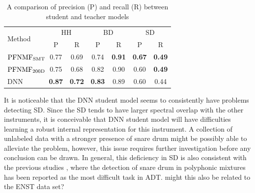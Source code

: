 \documentclass{article}
\begin{document}
\begin{table}
\centering
\begin{tabular}{l|cccccc}
\hline
\multirow{2}{*}{Method} & \multicolumn{2}{c}{HH}          & \multicolumn{2}{c}{BD}          & \multicolumn{2}{c}{SD}          \\ \cline{2-7} 
                        & P              & R              & P              & R              & P              & R              \\ \hline
$\text{PFNMF}_\mathrm{SMT}\hspace{-2mm}$             & 0.77          & 0.69          & 0.74          & \textbf{0.91} & \textbf{0.67} & \textbf{0.49} \\
$\text{PFNMF}_\mathrm{200D}\hspace{-2mm}$            & 0.75          & 0.68          & 0.82          & 0.90          & 0.60          & \textbf{0.49}          \\
DNN                     & \textbf{0.87} & \textbf{0.72} & \textbf{0.83} & 0.89          & 0.60          & 0.44          \\ \hline
\end{tabular}
\caption{A comparison of precision (P) and recall (R) between student and teacher models}
\label{tab:pr_comp}
\end{table}


It is noticeable that the DNN student model seems to consistently have problems detecting SD. Since the SD tends to have larger spectral overlap with the other instruments, it is conceivable that DNN student model will have difficulties learning a robust internal representation for this instrument. A collection of unlabeled data with a stronger presence of snare drum might be possibly able to alleviate the problem, however, this issue requires further investigation before any conclusion can be drawn. In general, this deficiency in SD is also consistent with the previous studies \cite{Paulus2009a, Wu2015a, Southall2016, Vogl2016}, where the detection of snare drum in polyphonic mixtures has been reported as the most difficult task in ADT. {\color{red}might this also be related to the ENST data set?}
\end{document}
